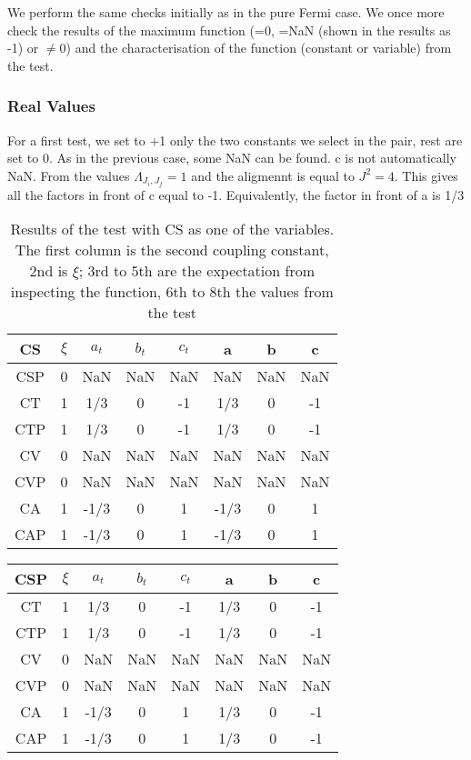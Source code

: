 \documentclass[twocolumn]{article}
\begin{document}
We perform the same checks initially as in the pure Fermi case. We once more check the results of the maximum function (=0, =NaN (shown in the results as -1) or $\neq$0) and the characterisation of the function (constant or variable) from the test. 

\subsubsection{Real Values}

For a first test, we set to +1 only the two constants we select in the pair, rest are set to 0. As in the previous case, some NaN can be found. c is not automatically NaN. From the values $\Lambda_{J_i,J_f} = 1$ and the aligmennt is equal to $J^2 = 4$. This gives all the factors in front of c equal to -1. Equivalently, the factor in front of a is 1/3

\begin{table}[H]
	\begin{tabular}{|c|c|c|c|c|c|c|c|}
		\hline
		CS & $\xi $& $a_t$ & $b_t$ & $c_t$ & a & b & c \\
		\hline
		CSP & 0 & NaN & NaN & NaN  & NaN & NaN & NaN   \\
		\hline
		CT & 1 & 1/3 & 0 & -1 & 1/3  & 0  & -1\\
		\hline
		CTP & 1 & 1/3 & 0 & -1  & 1/3  & 0  &  -1\\
		\hline
		CV & 0 & NaN & NaN & NaN  & NaN & NaN & NaN   \\
		\hline
		CVP & 0 & NaN & NaN & NaN  & NaN & NaN & NaN   \\
		\hline
		CA & 1 & -1/3 & 0 & 1  & -1/3  & 0  &  1\\
		\hline
		CAP & 1 & -1/3  & 0 & 1  & -1/3 & 0 & 1\\
		\hline
	\end{tabular}
	\caption{Results of the test with CS as one of the variables. The first column is the second coupling constant, 2nd is $\xi$; 3rd to 5th are the expectation from inspecting the function, 6th to 8th the values from the test}
\end{table}

\begin{table}[H]
	\begin{tabular}{|c|c|c|c|c|c|c|c|}
		\hline
		CSP & $\xi $& $a_t$ & $b_t$ & $c_t$ & a & b & c \\
		\hline
		CT & 1 & 1/3  & 0 & -1 & 1/3  & 0 & -1 \\
		\hline
		CTP & 1 & 1/3  & 0  & -1  & 1/3  & 0 & -1 \\
		\hline
		CV &  0 & NaN  & NaN  & NaN  &NaN & NaN  &  NaN \\
		\hline
		CVP & 0  & NaN  &  NaN  &  NaN  & NaN  & NaN &  NaN\\
		\hline
		CA & 1 & -1/3 & 0  & 1  & 1/3  & 0 & -1   \\
		\hline
		CAP & 1 &  -1/3 & 0  & 1  & 1/3  & 0 & -1  \\
		\hline
	\end{tabular}
\end{table}
\end{document}
